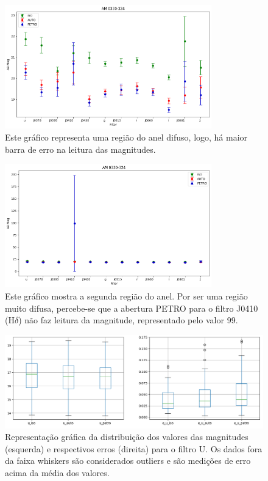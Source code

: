\begin{figure}[!h]
  \centering 
  \includegraphics[width=0.8\textwidth]{Imagens/AM0330324index4.png} 
  \caption[Magnitudes da galáxia AM 0330-324.]{Este gráfico representa uma região do anel difuso, logo, há maior barra de erro na leitura das magnitudes.}
  \label{fig:AM0330324index4} 
\end{figure}

\begin{figure}[!h]
  \centering 
  \includegraphics[width=0.8\textwidth]{Imagens/AM0330324index9.png} 
  \caption[Magnitudes da galáxia AM 0330-324.]{Este gráfico mostra a segunda região do anel. Por ser uma região muito difusa, percebe-se que a abertura PETRO para o filtro J0410 (H$\delta$) não faz leitura da magnitude, representado pelo valor 99.}
  \label{fig:AM0330324index9} 
\end{figure}

\begin{figure}[h]
  \centering 
  \includegraphics[width=1.0\textwidth]{Imagens/boxplot_aberturas_err.png}
  \caption[Distribuição dos valores das magnitudes e respectivos erros pela representação gráfica \emph{boxplot} e identificação de dados extrapolados para o filtro U.]{Representação gráfica da distribuição dos valores das magnitudes (esquerda) e respectivos erros (direita) para o filtro U. Os dados fora da faixa whiskers são considerados outliers e são medições de erro acima da média dos valores.}
  \label{fig:boxplot_aberturas} 
\end{figure}

